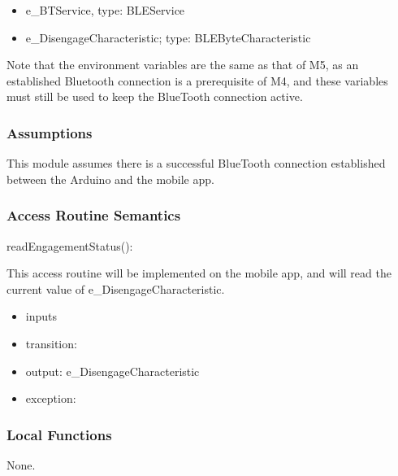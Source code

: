 \documentclass[12pt, titlepage]{article}
\begin{document}

\begin{itemize}
\item e\_BTService, type: BLEService
\item e\_DisengageCharacteristic; type: BLEByteCharacteristic
\end{itemize}

Note that the environment variables are the same as that of M5, as an established Bluetooth connection is a prerequisite of M4, and these variables must still be used to keep the BlueTooth connection active. 

\subsubsection{Assumptions}


This module assumes there is a successful BlueTooth connection established between the Arduino and the mobile app. 

\subsubsection{Access Routine Semantics}


\noindent readEngagementStatus():

This access routine will be implemented on the mobile app, and will read the current value of  e\_DisengageCharacteristic.

\begin{itemize}
\item inputs
\item transition: %
\item output: e\_DisengageCharacteristic
\item exception:  
\end{itemize}

\subsubsection{Local Functions}

None.
\end{document}
